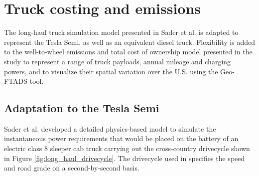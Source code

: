 \section{Truck costing and emissions}
\label{sec:costs_emissions}

The long-haul truck simulation model presented in Sader et al. \cite{Sader_2023} is adapted to represent the Tesla Semi, as well as an equivalent diesel truck. Flexibility is added to the well-to-wheel emissions and total cost of ownership model presented in the study to represent a range of truck payloads, annual mileage and charging powers, and to visualize their spatial variation over the U.S. using the Geo-FTADS tool. 

\subsection{Adaptation to the Tesla Semi}
\label{sec:semi_adaptations}

Sader et al. \cite{Sader_2023} developed a detailed physics-based model to simulate the instantaneous power requirements that would be placed on the battery of an electric class 8 sleeper cab truck carrying out the cross-country drivecycle shown in Figure \ref{fig:long_haul_drivecycle}. The drivecycle used in \cite{Sader_2023} specifies the speed and road grade on a second-by-second basis.

